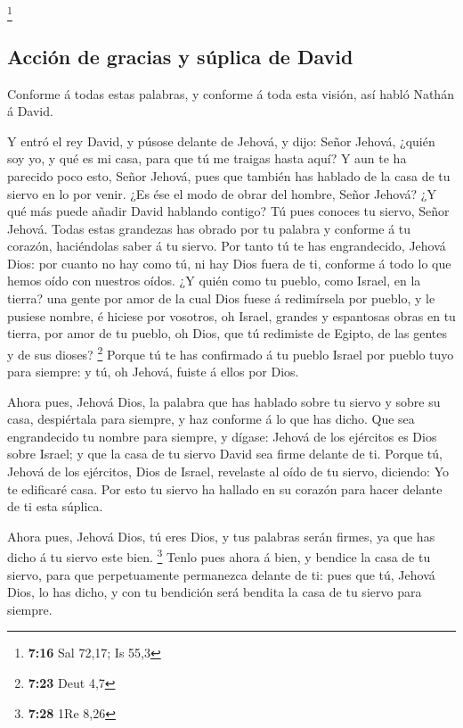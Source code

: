 \footnote{\textbf{7:16} Sal 72,17; Is 55,3}

\hypertarget{acciuxf3n-de-gracias-y-suxfaplica-de-david}{%
\subsection{Acción de gracias y súplica de
David}\label{acciuxf3n-de-gracias-y-suxfaplica-de-david}}

 Conforme á todas estas palabras, y conforme á toda esta
visión, así habló Nathán á David.

 Y entró el rey David, y púsose delante de Jehová, y dijo:
Señor Jehová, ¿quién soy yo, y qué es mi casa, para que tú me traigas
hasta aquí?  Y aun te ha parecido poco esto, Señor Jehová,
pues que también has hablado de la casa de tu siervo en lo por venir.
¿Es ése el modo de obrar del hombre, Señor Jehová?  ¿Y qué
más puede añadir David hablando contigo? Tú pues conoces tu siervo,
Señor Jehová.  Todas estas grandezas has obrado por tu
palabra y conforme á tu corazón, haciéndolas saber á tu siervo.
 Por tanto tú te has engrandecido, Jehová Dios: por cuanto
no hay como tú, ni hay Dios fuera de ti, conforme á todo lo que hemos
oído con nuestros oídos.  ¿Y quién como tu pueblo, como
Israel, en la tierra? una gente por amor de la cual Dios fuese á
redimírsela por pueblo, y le pusiese nombre, é hiciese por vosotros, oh
Israel, grandes y espantosas obras en tu tierra, por amor de tu pueblo,
oh Dios, que tú redimiste de Egipto, de las gentes y de sus dioses?
\footnote{\textbf{7:23} Deut 4,7}  Porque tú te has
confirmado á tu pueblo Israel por pueblo tuyo para siempre: y tú, oh
Jehová, fuiste á ellos por Dios.

 Ahora pues, Jehová Dios, la palabra que has hablado sobre
tu siervo y sobre su casa, despiértala para siempre, y haz conforme á lo
que has dicho.  Que sea engrandecido tu nombre para
siempre, y dígase: Jehová de los ejércitos es Dios sobre Israel; y que
la casa de tu siervo David sea firme delante de ti.  Porque
tú, Jehová de los ejércitos, Dios de Israel, revelaste al oído de tu
siervo, diciendo: Yo te edificaré casa. Por esto tu siervo ha hallado en
su corazón para hacer delante de ti esta súplica.

 Ahora pues, Jehová Dios, tú eres Dios, y tus palabras
serán firmes, ya que has dicho á tu siervo este bien. \footnote{\textbf{7:28}
  1Re 8,26}  Tenlo pues ahora á bien, y bendice la casa de
tu siervo, para que perpetuamente permanezca delante de ti: pues que tú,
Jehová Dios, lo has dicho, y con tu bendición será bendita la casa de tu
siervo para siempre.

